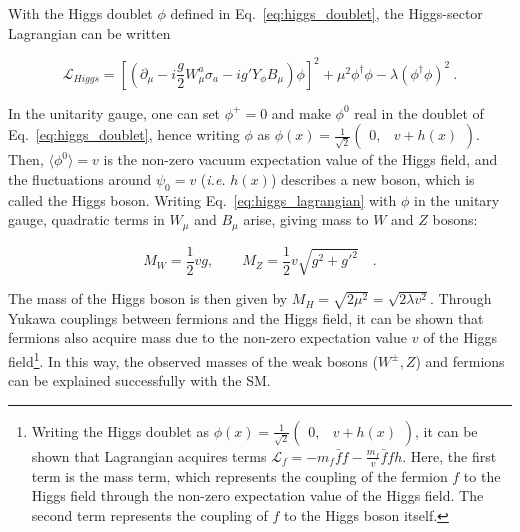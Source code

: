 With the Higgs doublet $\phi$ defined in Eq.~\ref{eq:higgs_doublet}, the Higgs-sector Lagrangian can be written

\begin{equation}
    \mathcal{L}_{Higgs} = \left[ \left( \partial_{\mu} - i \frac{g}{2} W_{\mu}^{a} \sigma_{a} - ig' Y_{\phi} B_{\mu} \right) \phi \right]^{2} + \mu^2 \phi^{\dag} \phi - \lambda \left( \phi^{\dag} \phi \right)^{2} \ .
    \label{eq:higgs_lagrangian}
\end{equation}

In the unitarity gauge, one can set $\phi^{+} = 0$ and make $\phi^{0}$ real in the doublet of Eq.~\ref{eq:higgs_doublet}, hence writing $\phi$ as
$\phi(x) = \frac{1}{\sqrt{2}} \begin{pmatrix} 0, & v + h(x) \end{pmatrix}$. 
Then, $\langle \phi^{0} \rangle = v$ is the non-zero vacuum expectation value of the Higgs field, and the fluctuations around $\psi_{0} = v$
(\textit{i.e.} $h(x)$) describes a new boson, which is called the Higgs boson. Writing Eq.~\ref{eq:higgs_lagrangian} with $\phi$ in the unitary gauge, 
quadratic terms in $W_{\mu}$ and $B_{\mu}$ arise, giving mass to $W$ and $Z$ bosons:

\begin{equation}
    M_{W} = \frac{1}{2} v g, \qquad M_{Z} = \frac{1}{2} v \sqrt{g^2 + g'^{2}} \quad .
\end{equation}

The mass of the Higgs boson is then given by $M_{H} = \sqrt{2 \mu^2} = \sqrt{2 \lambda v^2}$. Through Yukawa couplings between fermions and the
Higgs field, it can be shown that fermions also acquire mass due to the non-zero expectation value $v$ 
of the Higgs field\footnote{Writing the Higgs doublet as $\phi(x) = \frac{1}{\sqrt{2}} \begin{pmatrix} 0, & v + h(x) \end{pmatrix}$, it can be shown that
Lagrangian acquires terms $\mathcal{L}_{f} = -m_{f} \bar{f} f - \frac{m_f}{v} \bar{f} f h $. Here, the first term is the mass term, which
represents the coupling of the fermion $f$ to the Higgs field through the non-zero expectation value of the Higgs field.
The second term represents the coupling of $f$ to the Higgs boson itself.}. In this way, the observed masses of the weak bosons ($W^{\pm}, Z$)
and fermions can be explained successfully with the SM.


